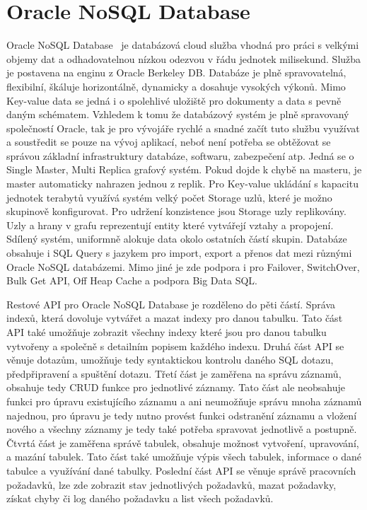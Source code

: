 \documentclass[czech,bachelor,dept460,male,csharp,cpdeclaration]{diploma}
\begin{document}
	\section{Oracle NoSQL Database}
	
	Oracle NoSQL Database~\cite{oraclenosqldb} je databázová cloud služba vhodná pro práci s velkými objemy dat a odhadovatelnou nízkou odezvou v řádu jednotek milisekund. Služba je postavena na enginu z Oracle Berkeley DB. Databáze je plně spravovatelná, flexibilní, škáluje horizontálně, dynamicky a dosahuje vysokých výkonů. Mimo Key-value data se jedná i o spolehlivé uložiště pro dokumenty a data s pevně daným schématem. Vzhledem k tomu že databázový systém je plně spravovaný společností Oracle, tak je pro vývojáře rychlé a snadné začít tuto službu využívat a soustředit se pouze na vývoj aplikací, neboť není potřeba se obtěžovat se správou základní infrastruktury databáze, softwaru, zabezpečení atp. Jedná se o Single Master, Multi Replica grafový systém. Pokud dojde k chybě na masteru, je master automaticky nahrazen jednou z replik. Pro Key-value ukládání s kapacitu jednotek terabytů využívá systém velký počet Storage uzlů, které je možno skupinově konfigurovat. Pro udržení konzistence jsou Storage uzly replikovány. Uzly a hrany v grafu reprezentují entity které vytvářejí vztahy a propojení. Sdílený systém, uniformně alokuje data okolo ostatních částí skupin. Databáze obsahuje i SQL Query s jazykem pro import, export a přenos dat mezi různými Oracle NoSQL databázemi. Mimo jiné je zde podpora i pro Failover, SwitchOver, Bulk Get API, Off Heap Cache a podpora Big Data SQL.
	
	Restové API pro Oracle NoSQL Database je rozděleno do pěti částí. Správa indexů, která dovoluje vytvářet a mazat indexy pro danou tabulku. Tato část API také umožňuje zobrazit všechny indexy které jsou pro danou tabulku vytvořeny a společně s detailním popisem každého indexu. Druhá část API se věnuje dotazům, umožňuje tedy syntaktickou kontrolu daného SQL dotazu, předpřipravení a spuštění dotazu. Třetí část je zaměřena na správu záznamů, obsahuje tedy CRUD funkce pro jednotlivé záznamy. Tato část ale neobsahuje funkci pro úpravu existujícího záznamu a ani neumožňuje správu mnoha záznamů najednou, pro úpravu je tedy nutno provést funkci odstranění záznamu a vložení nového a všechny záznamy je tedy také potřeba spravovat jednotlivě a postupně. Čtvrtá část je zaměřena správě tabulek, obsahuje možnost vytvoření, upravování, a mazání tabulek. Tato část také umožňuje výpis všech tabulek, informace o dané tabulce a využívání dané tabulky. Poslední část API se věnuje správě pracovních požadavků, lze zde zobrazit stav jednotlivých požadavků, mazat požadavky, získat chyby či log daného požadavku a list všech požadavků.
		
\end{document}
